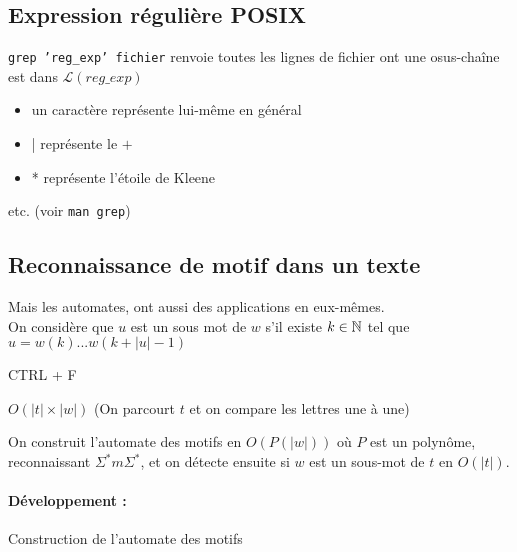 \subsection{Expression régulière POSIX}

\begin{personalise}[Motivation]
	\texttt{grep 'reg\_exp' fichier} renvoie toutes les lignes de fichier ont une osus-chaîne est dans $\mathcal L(reg\_exp)$
\end{personalise}

\begin{syntaxe}
	\begin{itemize}[label=$\bullet$]
		\item un caractère représente lui-même en général
		\item | représente le $+$
		\item * représente l'étoile de Kleene
	\end{itemize}
	etc. (voir \texttt{man grep})
\end{syntaxe}

\subsection{Reconnaissance de motif dans un texte}

Mais les automates, ont aussi des applications en eux-mêmes.\\

On considère que $u$ est un sous mot de $w$ s'il existe $k \in \mathbb{N}$ tel que $u = w(k)...w(k+|u|-1)$

\begin{personalise}[Motivation]
	CTRL + F
\end{personalise}

\begin{personalise}
	$O(|t| \times |w|)$ (On parcourt $t$ et on compare les lettres une à une)
\end{personalise}

\begin{personalise}
	On construit l'automate des motifs en $O(P(|w|))$ où $P$ est un polynôme, reconnaissant $\Sigma^*m\Sigma^*$, et on détecte ensuite si $w$ est un sous-mot de $t$ en $O(|t|)$.
\end{personalise}

\paragraph{Développement :} Construction de l'automate des motifs

